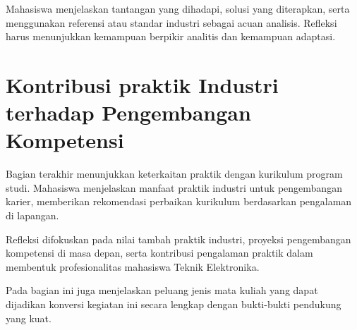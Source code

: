 Mahasiswa menjelaskan tantangan yang dihadapi, solusi yang diterapkan, serta menggunakan referensi atau standar industri sebagai acuan analisis. Refleksi harus menunjukkan kemampuan berpikir analitis dan kemampuan adaptasi.

\section{Kontribusi praktik Industri terhadap Pengembangan Kompetensi}
Bagian terakhir menunjukkan keterkaitan praktik dengan kurikulum program studi. Mahasiswa menjelaskan manfaat praktik industri untuk pengembangan karier, memberikan rekomendasi perbaikan kurikulum berdasarkan pengalaman di lapangan.

Refleksi difokuskan pada nilai tambah praktik industri, proyeksi pengembangan kompetensi di masa depan, serta kontribusi pengalaman praktik dalam membentuk profesionalitas mahasiswa Teknik Elektronika.

Pada bagian ini juga menjelaskan peluang jenis mata kuliah yang dapat dijadikan konversi kegiatan \tipe ini secara lengkap dengan bukti-bukti pendukung yang kuat.